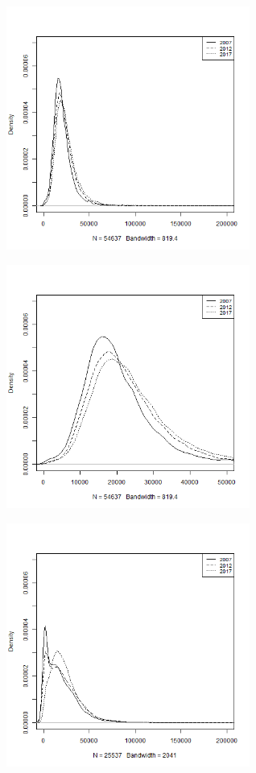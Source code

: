 \documentclass[12pt,]{article}
\let\origfigure\figure
\let\endorigfigure\endfigure
\renewenvironment{figure}[1][2] {
        \expandafter\origfigure\expandafter[H]
      } {\endorigfigure}
\begin{document}
\begin{figure}
\centering
\includegraphics[width=0.60000\textwidth]{img/densityp13.png}
\caption{Post-tax disposable income - Equal sharing}
\end{figure}

\begin{figure}
\centering
\includegraphics[width=0.60000\textwidth]{img/densityp13closer.png}
\caption{Post-tax disposable income - Equal sharing}
\end{figure}

\begin{figure}
\centering
\includegraphics[width=0.60000\textwidth]{img/densityp23.png}
\caption{Post-tax disposable income - Partial sharing}
\end{figure}
\end{document}
